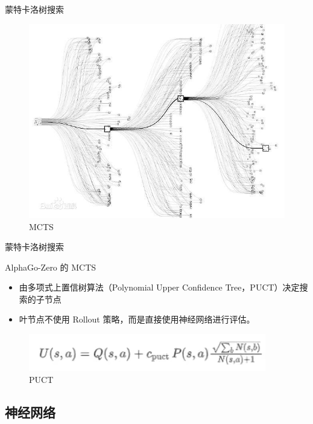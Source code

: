 \documentclass[compress]{beamer}
\begin{document}
\begin{frame}{蒙特卡洛树搜索}
  \begin{figure}[htbp]
      \centering
      \includegraphics[width=0.6\linewidth]{mc.jpg}
      \caption{MCTS}
  \end{figure}
\end{frame}

\begin{frame}{蒙特卡洛树搜索}
  \begin{block}{AlphaGo-Zero 的 MCTS}
	\begin{itemize}
		\item 由多项式上置信树算法（Polynomial Upper Confidence Tree，PUCT）决定搜索的子节点
		\item 叶节点不使用 Rollout 策略，而是直接使用神经网络进行评估。
	\end{itemize}
  \end{block}
  \begin{figure}[htbp]
	    \centering
	    \begin{minipage}[t]{0.7\textwidth}
	      \centering
	      \includegraphics[width=0.9\linewidth]{puct.png}
	      \caption{PUCT}
	    \end{minipage}
  \end{figure}
\end{frame}

\subsection{神经网络}
\end{document}
